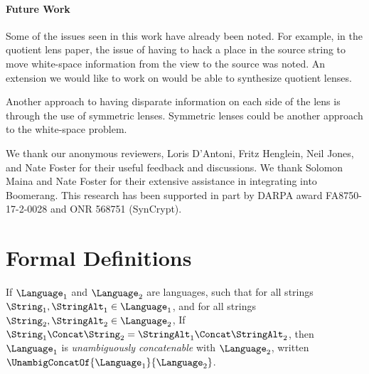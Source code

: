 \documentclass[acmsmall,screen]{acmart}
\begin{document}

\ifdraft
\paragraph*{Future Work}
Some of the issues seen in this work have already been noted.  For example, in the
quotient lens paper, the issue of having to hack a place in the source string to
move white-space information from the view to the source was noted.  An extension
we would like to work on would be able to synthesize quotient lenses.

Another approach to having disparate information on each side of the lens is
through the use of symmetric lenses.  Symmetric lenses could be another approach to the
white-space problem.

\fi


\begin{acks}
  We thank our anonymous reviewers, Loris D'Antoni, Fritz Henglein, Neil Jones,
  and Nate Foster for their useful feedback and discussions.  We thank Solomon
  Maina and Nate Foster for their extensive assistance in integrating
  \Optician{} into Boomerang.  This research has been supported in part by DARPA
  award FA8750-17-2-0028 and ONR 568751 (SynCrypt).
\end{acks}

\appendix

\ifanon\else
\fi





\ifappendices



\onecolumn
\section{Formal Definitions}
\begin{definition}
  If $\Language_1$ and $\Language_2$ are languages, such that
  for all strings $\String_1,\StringAlt_1 \in \Language_1$, and for all strings
  $\String_2,\StringAlt_2 \in \Language_2$, If $\String_1\Concat\String_2 =
  \StringAlt_1\Concat\StringAlt_2$, then $\Language_1$ is \textit{unambiguously
    concatenable} with $\Language_2$, written
  $\UnambigConcatOf{\Language_1}{\Language_2}$.
\end{definition}
\end{document}
